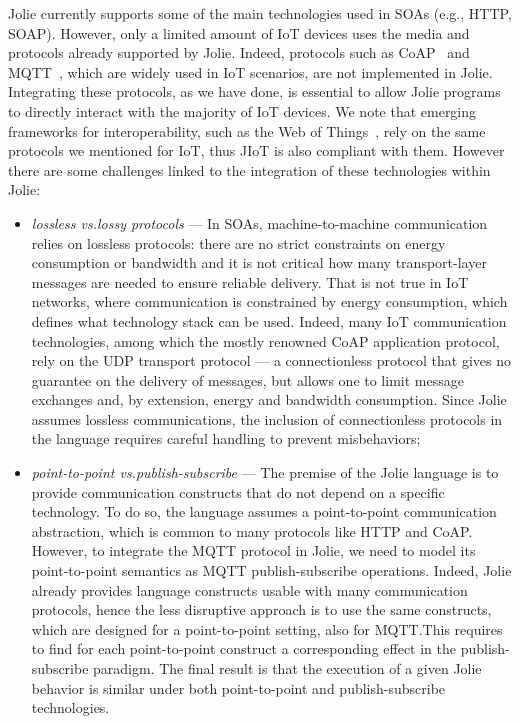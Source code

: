 Jolie currently supports some of the main technologies used in SOAs (e.g.,
HTTP, SOAP). However, only a limited amount of IoT devices uses the media and
protocols already supported by Jolie. Indeed, protocols such as
CoAP~\cite{doi:10.17487/RFC7252,coap} and MQTT~\cite{mqtt-v3.1.1,mqtt}, which
are widely used in IoT scenarios, are not implemented in Jolie. Integrating
these protocols, as we have done, is essential to allow Jolie programs to
directly interact with the majority of IoT devices. We note that emerging
frameworks for interoperability, such as the Web of Things~\cite{w3c17}, rely
on the same protocols we mentioned for IoT, thus JIoT is also compliant with
them.
%
However there are some
challenges linked to the integration of these technologies within Jolie:

\begin{itemize}
  \item \textit{lossless vs.\@ lossy protocols} --- In SOAs,
  machine-to-machine communication relies on lossless protocols: there are no
  strict constraints on energy consumption or bandwidth and it is not critical
  how many transport-layer messages are needed to ensure reliable delivery.
  That is not true in IoT networks, where communication is constrained by
  energy consumption, which defines what technology stack can be used. Indeed,
  many IoT communication technologies, among which the mostly renowned CoAP
  application protocol, rely on the UDP transport protocol --- a connectionless
  protocol that gives no guarantee on the delivery of messages, but allows one
  to limit message exchanges and, by extension, energy and bandwidth
  consumption. Since Jolie assumes lossless communications, the inclusion of
  connectionless protocols in the language requires careful handling to prevent
  misbehaviors;

  \item \textit{point-to-point vs.\@ publish-subscribe} --- The premise of the
  Jolie language is to provide communication constructs that do not depend on a
  specific technology. To do so, the language assumes a point-to-point
  communication abstraction, which is common to many protocols like HTTP and
  CoAP. However, to integrate the MQTT protocol in Jolie, we need to model its
  point-to-point semantics as MQTT publish-subscribe operations. Indeed, Jolie
  already provides language constructs usable with many communication
  protocols, hence the less disruptive approach is to use the same constructs,
  which are designed for a point-to-point setting, also for MQTT.\@ This
  requires to find for each point-to-point construct a corresponding effect in
  the publish-subscribe paradigm. The final result is that the execution of a given Jolie behavior is similar under both point-to-point and publish-subscribe technologies.
  
\end{itemize} 